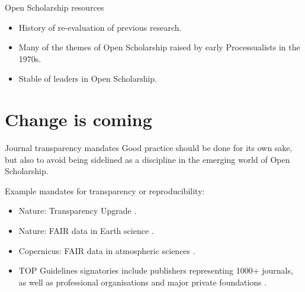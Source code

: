 \documentclass[aspectratio=169, 11pt]{beamer} %
\begin{document}
\begin{frame}{Open Scholarship resources}
    \begin{itemize}[label=\textbullet]
        \item History of re-evaluation of previous research.
        \item Many of the themes of Open Scholarship raised by early Processualists in the 1970s. \cite{Hole1973-cy} 
        \item Stable of leaders in Open Scholarship. \cite{Kansa2010-qx, Kintigh2006-wa, Marwick2017-bz}
    \end{itemize}
\end{frame}

\section{Change is coming}

\begin{frame}{Journal transparency mandates}
  Good practice should be done for its own sake, but also to avoid being sidelined as a discipline in the emerging world of Open Scholarship. \par
  Example mandates for transparency or reproducibility:
    \begin{itemize}[label=\textbullet]
        \item Nature: Transparency Upgrade \cite{Nature2017-lq}.
        \item Nature: FAIR data in Earth science \cite{Nature2019-ng}.
        \item Copernicus: FAIR data in atmospheric sciences \cite{Van_Edig2018-bu}.
        \item TOP Guidelines signatories include publishers representing 1000+ journals, as well as professional organisations and major private foundations  \cite{Cos2019-mr}.
    \end{itemize}
\end{frame}

\end{document}
